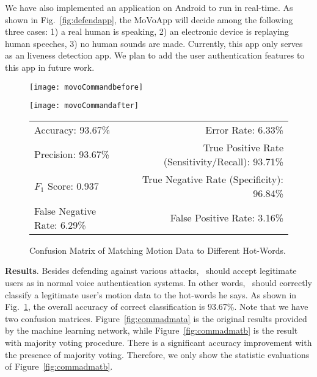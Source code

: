 We have also implemented an application on Android to run {\uu} in real-time. As shown in Fig.~\ref{fig:defendapp}, the MoVoApp will decide among the following three cases: 1) a real human is speaking, 2) an electronic device is replaying human speeches, 3) no human sounds are made. Currently, this app only serves as an liveness detection app. We plan to add the user authentication features to this app  in future work. 
\begin{figure}[H]
	\centering
	\begin{minipage}{.35\linewidth}
		\texttt{[image: movoCommandbefore]}
		\label{fig:commadmata}
		\vspace{.05in}
	\end{minipage}
	\begin{minipage}{.35\linewidth}
		\texttt{[image: movoCommandafter]}
		\label{fig:commadmatb}
		\vspace{.05in}
	\end{minipage}
	
	\centering
	\begin{tabular}{lr}
		\toprule
		Accuracy: 93.67\% & \hspace{-.55in} Error Rate: 6.33\% \\
		Precision: 93.67\% & \hspace{-.55in} True Positive Rate (Sensitivity/Recall): 93.71\% \\
		$F_1$ Score: 0.937 & \hspace{-.55in} True Negative Rate (Specificity): 96.84\% \\
		False Negative Rate: 6.29\%  & \hspace{-.55in} False Positive Rate: 3.16\% \\
		\bottomrule
	\end{tabular}
	\caption{Confusion Matrix of Matching Motion Data to Different Hot-Words. }
	\label{fig:commadmat}
\end{figure}


\textbf{Results}.
%
Besides defending against various attacks, \shortname~should accept legitimate users as in normal voice authentication systems. In other words, \shortname~should correctly classify a legitimate user's motion data to the hot-words he says. As shown in Fig.~\ref{fig:commadmat}, the overall accuracy of correct classification is 93.67\%.  
Note that we have two confusion matrices. Figure~\ref{fig:commadmata} is the original results provided by the machine learning network, while Figure~\ref{fig:commadmatb} is the result with majority voting procedure. There is a significant accuracy improvement with the presence of majority voting. Therefore, we only show the statistic evaluations of Figure~\ref{fig:commadmatb}. 


